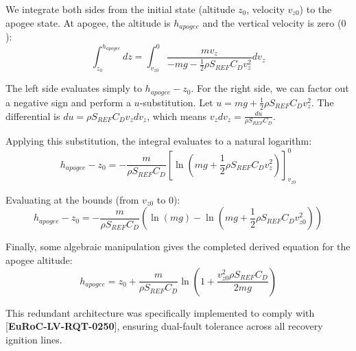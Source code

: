 \documentclass[11pt, a4paper]{article} %
\newcommand{\req}[1]{[\textcolor{EtseNavy}{\textbf{#1}}]}
\begin{document}
We integrate both sides from the initial state (altitude $z_0$, velocity $v_{z0}$) to the apogee state. At apogee, the altitude is $h_{apogee}$ and the vertical velocity is zero ($0$):
\begin{equation}
    \int_{z_0}^{h_{apogee}} dz = \int_{v_{z0}}^{0} \frac{m v_z}{-mg - \frac{1}{2} \rho S_{REF} C_D v_z^2} dv_z
\end{equation}

The left side evaluates simply to $h_{apogee} - z_0$. For the right side, we can factor out a negative sign and perform a $u$-substitution. Let $u = mg + \frac{1}{2} \rho S_{REF} C_D v_z^2$. The differential is $du = \rho S_{REF} C_D v_z dv_z$, which means $v_z dv_z = \frac{du}{\rho S_{REF} C_D}$. 

Applying this substitution, the integral evaluates to a natural logarithm:
\begin{equation}
    h_{apogee} - z_0 = -\frac{m}{\rho S_{REF} C_D} \left[ \ln \left( mg + \frac{1}{2} \rho S_{REF} C_D v_z^2 \right) \right]_{v_{z0}}^{0}
\end{equation}

Evaluating at the bounds (from $v_{z0}$ to $0$):
\begin{equation}
    h_{apogee} - z_0 = -\frac{m}{\rho S_{REF} C_D} \left( \ln(mg) - \ln \left( mg + \frac{1}{2} \rho S_{REF} C_D v_{z0}^2 \right) \right)
\end{equation}

Finally, some algebraic manipulation gives the completed derived equation for the apogee altitude:
\begin{equation}
    h_{apogee} = z_0 + \frac{m}{\rho S_{REF} C_D} \ln \left( 1 + \frac{v_{z0}^2 \rho S_{REF} C_D}{2mg} \right)
\end{equation}


This redundant architecture was specifically implemented to comply with \req{EuRoC-LV-RQT-0250}, ensuring dual-fault tolerance across all recovery ignition lines.
\end{document}
